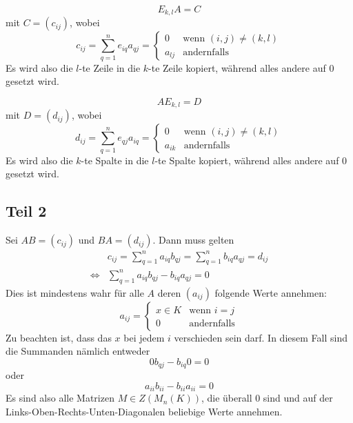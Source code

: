 \documentclass[a4paper,10pt]{article}
\begin{document}
\begin{equation}
 E_{k,l}A = C
\end{equation}
mit $C = (c_{ij})$, wobei
\begin{equation}
 c_{ij} = \sum_{q = 1}^n e_{iq}a_{qj} =
   \begin{cases}
    0 & \text{wenn $(i,j) \ne (k,l)$}\\
    a_{lj} & \text{andernfalls}
   \end{cases}
\end{equation}
Es wird also die $l$-te Zeile in die $k$-te Zeile kopiert, während alles andere auf $0$ gesetzt wird.

\begin{equation}
 AE_{k,l} = D
\end{equation}
mit $D = (d_{ij})$, wobei
\begin{equation}
 d_{ij} = \sum_{q = 1}^n e_{qj}a_{iq} =
   \begin{cases}
    0 & \text{wenn $(i,j) \ne (k,l)$}\\
    a_{ik} & \text{andernfalls}
   \end{cases}
\end{equation}
Es wird also die $k$-te Spalte in die $l$-te Spalte kopiert, während alles andere auf $0$ gesetzt wird.

\subsection*{Teil 2}

Sei $AB = (c_{ij})$ und $BA = (d_{ij})$.
Dann muss gelten
\begin{align}
 & c_{ij} = \sum_{q = 1}^n a_{iq}b_{qj} = \sum_{q = 1}^n b_{iq}a_{qj} = d_{ij}\\
 \Leftrightarrow & \sum_{q = 1}^n a_{iq}b_{qj} - b_{iq}a_{qj} = 0
\end{align}
Dies ist mindestens wahr für alle $A$ deren $(a_{ij})$ folgende Werte annehmen:
\begin{equation}
 a_{ij} =
   \begin{cases}
    x \in K & \text{wenn $i = j$}\\
    0 & \text{andernfalls}
   \end{cases}
\end{equation}
Zu beachten ist, dass das $x$ bei jedem $i$ verschieden sein darf.
In diesem Fall sind die Summanden nämlich entweder
\begin{equation}
 0b_{qj} - b_{iq}0 = 0
\end{equation}
oder
\begin{equation}
 a_{ii}b_{ii} - b_{ii}a_{ii} = 0
\end{equation}
Es sind also alle Matrizen $M \in Z(M_n(K))$, die überall $0$ sind und auf der Links-Oben-Rechts-Unten-Diagonalen beliebige Werte annehmen.
\end{document}
